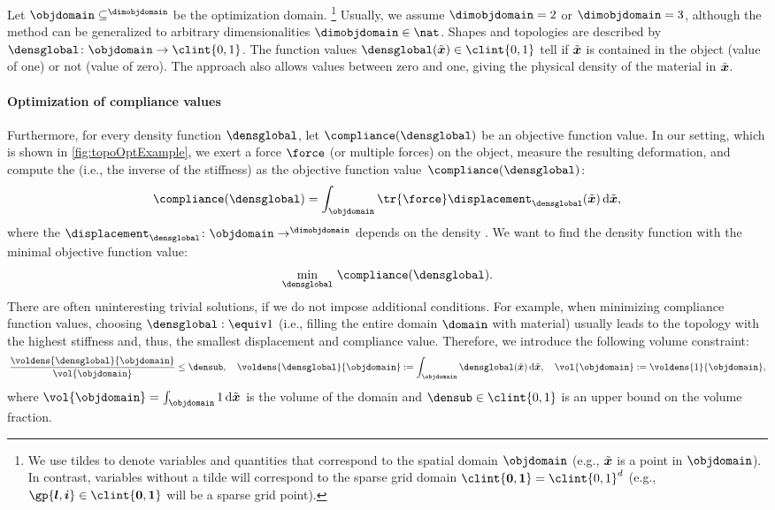 Let $\objdomain \subset \real^{\dimobjdomain}$ be the optimization domain.%
\footnote{%
  We use tildes to denote variables and quantities
  that correspond to the spatial domain $\objdomain$
  (e.g., $\tilde{{\boldsymbol{x}}}$ is a point in $\objdomain$).
  In contrast, variables without a tilde will correspond
  to the sparse grid domain $\clint{\*0, \*1} = \clint{0, 1}^d$
  (e.g., $\gp{\*l,\*i} \in \clint{\*0, \*1}$ will be a sparse grid point).%
}
Usually, we assume $\dimobjdomain = 2$ or $\dimobjdomain = 3$,
although the method can be generalized to
arbitrary dimensionalities $\dimobjdomain \in \nat$.
Shapes and topologies are described by 
$\densglobal\colon \objdomain \to \clint{0, 1}$.
The function values $\densglobal(\tilde{\*x}) \in \clint{0, 1}$
tell if $\tilde{{\boldsymbol{x}}}$ is contained in the object (value of one) or
not (value of zero).
The  approach also allows values between
zero and one, giving the physical density of the material in $\tilde{{\boldsymbol{x}}}$.

\paragraph{Optimization of compliance values}

Furthermore, for every density function $\densglobal$,
let $\compliance(\densglobal)$ be an objective function value.
In our setting, which is shown in \cref{fig:topoOptExample},
we exert a force $\force$ (or multiple forces) on the object,
measure the resulting deformation, and
compute the  (i.e., the inverse of the stiffness) as
the objective function value~$\compliance(\densglobal)$:
\begin{equation}
  \compliance(\densglobal)
  = \int_{\objdomain} \tr{\force} \displacement_{\densglobal}(\tilde{\*x})
  \diff\tilde{\*x},
\end{equation}
where the 
$\displacement_{\densglobal}\colon \objdomain \to \real^{\dimobjdomain}$
depends on the density \cite{Huebner14Mehrdimensionale}.
We want to find the density function
with the minimal objective function value:
\begin{equation}
  \label{eq:topoOptProblemContinuous}
  \min_{\densglobal}\, \compliance(\densglobal).
\end{equation}
There are often uninteresting trivial solutions,
if we do not impose additional conditions.
For example, when minimizing compliance function values,
choosing $\densglobal :\equiv 1$
(i.e., filling the entire domain $\domain$ with material)
usually leads to the topology with the
highest stiffness and, thus, the smallest displacement and compliance value.
Therefore, we introduce the following volume constraint:
\begin{equation}
  \frac{\voldens{\densglobal}{\objdomain}}{\vol{\objdomain}} \le \densub,\quad
  \voldens{\densglobal}{\objdomain}
  := \int_{\objdomain} \densglobal(\tilde{\*x}) \diff\tilde{\*x},\quad
  \vol{\objdomain}
  := \voldens{1}{\objdomain},
\end{equation}
where $\vol{\objdomain} = \int_{\objdomain} 1 \diff\tilde{\*x}$
is the volume of the domain and
$\densub \in \clint{0, 1}$ is an upper bound on the volume fraction.

